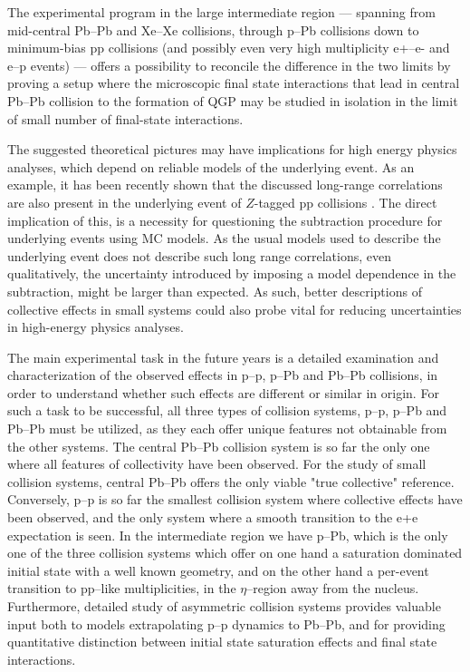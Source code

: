 \documentclass[../report.tex]{subfiles}
\begin{document}
The experimental program in the large intermediate region --- spanning from mid-central Pb--Pb and Xe--Xe collisions, through p--Pb collisions down to minimum-bias pp collisions (and possibly even very high multiplicity e+--e- and e--p events) --- offers a possibility to reconcile the difference in the two limits by proving a setup where the microscopic final state interactions that lead in central Pb--Pb collision to the formation of QGP may be studied in isolation in the limit of small number of final-state interactions.  

The suggested theoretical pictures may have implications for high energy physics analyses, which depend on reliable models of the underlying event. As an example, it has been recently shown that the discussed long-range correlations are also present in the underlying event of $Z$-tagged pp collisions \cite{ATLAS:2017nkt}. The direct implication of this, is a necessity for questioning the subtraction procedure for underlying events using MC models. As the usual models used to describe the underlying event does not describe such long range correlations, even qualitatively, the uncertainty introduced by imposing a model dependence in the subtraction, might be larger than expected. As such, better descriptions of collective effects in small systems could also probe vital for reducing uncertainties in high-energy physics analyses.

The main experimental task in the future years is a detailed examination and characterization of the observed effects in p--p, p--Pb and Pb--Pb collisions, in order to understand whether such effects are different or similar in origin. For such a task to be successful, all three types of collision systems, p--p, p--Pb and Pb--Pb must be utilized, as they each offer unique features not obtainable from the other systems. The central Pb--Pb collision system is so far the only one where all features of collectivity have been observed. For the study of small collision systems, central Pb--Pb offers the only viable "true collective" reference. Conversely, p--p is so far the smallest collision system where collective effects have been observed, and the only system where a smooth transition to the e+e expectation is seen. In the intermediate region we have p--Pb, which is the only one of the three collision systems which offer on one hand a saturation dominated initial state with a well known geometry, and on the other hand a per-event transition to pp--like multiplicities, in the $\eta$--region away from the nucleus. Furthermore, detailed study of asymmetric collision systems provides valuable input both to models extrapolating p--p dynamics to Pb--Pb, and for providing quantitative distinction between initial state saturation effects and final state interactions.
\end{document}
